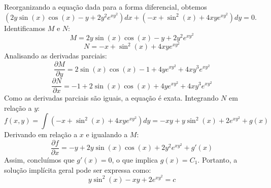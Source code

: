 \documentclass[oneside,12pt,a4paper]{report}
\begin{document}
\begin{resolucao}
        \itemresolucao Reorganizando a equação dada para a forma diferencial, obtemos $(2y\sin(x)\cos(x)-y+2y^2e^{xy^2})dx+(-x+\sin^2(x)+4xye^{xy^2})dy=0$. Identificamos $M$ e $N$:
        \[M=2y\sin(x)\cos(x)-y+2y^2e^{xy^2}\]
        \[N=-x+\sin^2(x)+4xye^{xy^2}\]
        Analisando as derivadas parciais:
        \[\frac{\partial M}{\partial y}=2\sin(x)\cos(x)-1+4ye^{xy^2}+4xy^3e^{xy^2}\]
        \[\frac{\partial N}{\partial x}=-1+2\sin(x)\cos(x)+4ye^{xy^2}+4xy^3e^{xy^2}\]
        Como as derivadas parciais são iguais, a equação é exata. Integrando $N$ em relação a $y$:
        \[f(x,y)=\int\left(-x+\sin^2(x)+4xye^{xy^2}\right)dy=-xy+y\sin^2(x)+2e^{xy^2}+g(x)\]
        Derivando em relação a $x$ e igualando a $M$:
        \[\frac{\partial f}{\partial x}=-y+2y\sin(x)\cos(x)+2y^2e^{xy^2}+g'(x)\]
        Assim, concluímos que $g'(x)=0$, o que implica $g(x)=C_1$. Portanto, a solução implícita geral pode ser expressa como:
        \[\boxed{y\sin^2(x)-xy+2e^{xy^2}=c}\]
    \end{resolucao}
\end{document}
